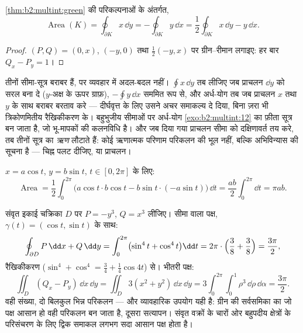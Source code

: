 \begin{corollary}[सीमा से क्षेत्रफल]\label{cor:b2:multint:area}
\cref{thm:b2:multint:green} की परिकल्पनाओं के अंतर्गत,
\[
\operatorname{Area}(K)
= \oint_{\partial K} x\,\dd y
= -\oint_{\partial K} y\,\dd x
= \frac12\oint_{\partial K} x\,\dd y - y\,\dd x .
\]
\end{corollary}

\begin{proof}
$(P, Q) = (0, x)$, $(-y, 0)$ तथा $\frac12(-y, x)$ पर ग्रीन--रीमान लगाइए: हर बार $Q_x - P_y = 1$।
\end{proof}

\begin{remark}[तीनों क्षेत्रफल-सूत्रों में से चुनना]
तीनों सीमा-सूत्र बराबर हैं, पर व्यवहार में अदल-बदल  नहीं।
$\oint x\,\dd y$ तब लीजिए जब प्राचलन $\dd y$ को सरल बना दे ($y$-अक्ष के ऊपर
ग्राफ़), $-\oint y\,\dd x$ सममित रूप से, और  अर्ध-योग तब जब प्राचलन $x$
तथा $y$ के साथ बराबर बरताव करे --- दीर्घवृत्त के लिए उसने अचर
समाकल्य दे दिया, बिना ज़रा भी त्रिकोणमितीय रैखिकीकरण के। बहुभुजीय
सीमाओं पर अर्ध-योग \cref{exo:b2:multint:12} का फ़ीता सूत्र बन जाता है, जो भू-मापकों की
कलनविधि है। और जब दिया गया प्राचलन सीमा को दक्षिणावर्त तय करे, तब
तीनों सूत्र  का \emph{ऋण} लौटाते हैं: कोई ऋणात्मक परिणाम
परिकलन की भूल नहीं, बल्कि अभिविन्यास की सूचना है --- चिह्न पलट
दीजिए, या प्राचलन।
\end{remark}

\begin{example}[दीर्घवृत्त का क्षेत्रफल]\label{ex:b2:multint:ellipsearea}
$x = a\cos t$, $y = b\sin t$, $t \in [0, 2\pi]$ के लिए:
\[
\operatorname{Area}
= \frac12\int_0^{2\pi}\bigl(a\cos t \cdot b\cos t
- b\sin t\cdot(-a\sin t)\bigr)\,\dd t
= \frac{ab}{2}\int_0^{2\pi}\dd t = \pi ab .
\]
\end{example}

\begin{example}[जाँच के रूप में
ग्रीन--रीमान]\label{ex:b2:multint:greencheck}
संवृत इकाई चक्रिका $D$ पर $P = -y^3$, $Q = x^3$ लीजिए। सीमा वाला पक्ष, $\gamma(t) = (\cos t, \sin t)$ के
साथ:
\[
\oint_{\partial D}P\,\dd x + Q\,\dd y
= \int_0^{2\pi}\bigl(\sin^4 t + \cos^4 t\bigr)\dd t
= 2\pi\cdot\Bigl(\frac38 + \frac38\Bigr) = \frac{3\pi}2 ,
\]
रैखिकीकरण ($\sin^4 + \cos^4 = \tfrac34 +
\tfrac14\cos4t$) से। भीतरी पक्ष:
\[
\iint_D(Q_x - P_y)\,\dd x\,\dd y
= \iint_D 3(x^2 + y^2)\,\dd x\,\dd y
= 3\int_0^{2\pi}\!\!\int_0^1\rho^3\,\dd\rho\,\dd\alpha
= \frac{3\pi}2 .
\]
वही संख्या, दो बिलकुल भिन्न परिकलन --- और व्यावहारिक उपयोग यही है:
ग्रीन की सर्वसमिका का जो पक्ष आसान हो वही परिकलन बन जाता है, दूसरा
सत्यापन। संवृत वक्रों के चारों ओर बहुपदीय क्षेत्रों के परिसंचरण के
लिए द्विक समाकल लगभग सदा आसान पक्ष होता है।
\end{example}

